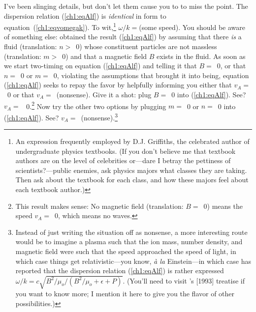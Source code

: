 I've been slinging details, but don't let them cause you to to miss the
point. The dispersion relation (\ref{ch1:eqAlf}) is \emph{identical} in form to
equation~(\ref{ch1:eqvomegak}). To wit,\footnote{An expression frequently
  employed by D.J. Griffiths, the celebrated author of undergraduate physics
  textbooks. (If you don't believe me that textbook authors are on the level of
  celebrities or---dare I betray the pettiness of scientists?---public enemies,
  ask physics majors what classes they are taking. Then ask about the textbook
  for each class, and how these majors feel about each textbook author.)}
$ \omega / k = $(some speed). You should be aware of something else: \Alf
obtained the result (\ref{ch1:eqAlf}) by assuming that there \emph{is} a fluid
(translation: $n >$~0) whose constituent particles are not massless
(translation: $m >$~0) and that a magnetic field $B$ exists in the fluid. As
soon as we start two-timing on equation (\ref{ch1:eqAlf}) and telling it that
$B =$~0, or that $n =$~0 or $m =$~0, violating the assumptions that brought it
into being, equation (\ref{ch1:eqAlf}) seeks to repay the favor by helpfully
informing you either that $v_A =$~0 or that $v_A =$~(nonsense). Give it a shot:
plug $B =$~0 into (\ref{ch1:eqAlf}). See? $v_A =$~ 0.\footnote{This result makes
  sense: No magnetic field (translation: $B =$~0) means the \Alf speed
  $v_A =$~0, which means no \Alf waves.}  Now try the other two options by
plugging $m =$~0 or $n =$~0 into (\ref{ch1:eqAlf}). See?
$v_A =$~(nonsense).\footnote{Instead of just writing the situation off as
  nonsense, a more interesting route would be to imagine a plasma such that the
  ion mass, number density, and magnetic field were such that the \Alf speed
  approached the speed of light, in which case things get relativistic---you
  know, \textit{\`{a} la} Einstein---in which case \citet{Gedalin1993} has
  reported that the dispersion relation (\ref{ch1:eqAlf}) is rather expressed
  $\omega / k = c \sqrt{B^2/\mu_o / (B^2/\mu_o + \epsilon + P)}$. (You'll need
  to visit \citeauthor{Gedalin1993}'s [1993] treatise if you want to know more;
  I mention it here to give you the flavor of other
  possibilities.)}%

